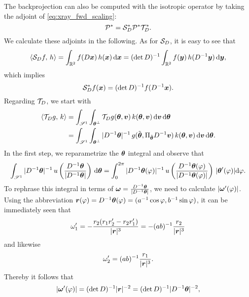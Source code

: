 \documentclass{amsart}
\newcommand*{\Dinv}{{\ensuremath{D^{-1}}}}
\renewcommand*{\phi}{\varphi}
\begin{document}
The backprojection can also be computed with the isotropic operator by taking the adjoint of \eqref{eq:xray_fwd_scaling}:
%
\begin{equation}
 \label{eq:xray_backproj_scaling}
 {\ensuremath{\mathcal{P}}}^* = {\mathcal{S}}_D^* {\mathcal{P}}^* {\mathcal{T}}_D^*.
\end{equation} 
%
We calculate these adjoints in the following. As for ${\mathcal{S}}_D$, it is easy to see that
%
\begin{equation*}
 \INNER{\OPS_D f}{h} = \int_{\RR^2} f(D\Bx)\, h(\Bx)\, \D\Bx = (\det D)^{-1} \int_{\RR^2} f(\By)\, h(\Dinv\By)\, \D\By, 
\end{equation*}
%
which implies
%
\begin{equation}
 \label{eq:vol_scaling_adjoint}
 \OPS_D^* f(\Bx) = (\det D)^{-1} f(\Dinv\Bx).
\end{equation}
%
Regarding ${\mathcal{T}}_D$, we start with
%
\begin{align}
 \INNER{\OPT_D g}{k} 
 &= \int_{\SPHERE^1} \int_{\Btheta^\perp} \OPT_D g(\Btheta, \Bv)\, k(\Btheta, \Bv)\, \D\Bv\, \D\Btheta \notag \\
 \label{eq:proj_scaling_adjoint_step1}
 &= \int_{\SPHERE^1} \int_{\Btheta^\perp} \ABS{\Dinv \Btheta}^{-1}\, g(\tilde\Btheta, \Pi_{\tilde\Btheta} \Dinv\Bv)\, 
 k(\Btheta, \Bv)\, \D\Bv\, \D\Btheta.
\end{align}
%
In the first step, we reparametrize the ${\boldsymbol{\theta}}$ integral and observe that
%
\begin{equation}
 \label{eq:spherint_reparam_step1}
 \int_{\SPHERE^1} \ABS{\Dinv \Btheta}^{-1}\, u\left(\frac{\Dinv\Btheta}{\ABS{\Dinv\Btheta}}\right)\, \D \Btheta = 
 \int_0^{2\pi} \ABS{\Dinv \Btheta(\phi)}^{-1}\, u\left(\frac{\Dinv\Btheta(\phi)}{\ABS{\Dinv\Btheta(\phi)}}\right)\, \ABS{\Btheta'(\phi)} 
 \D\phi. 
\end{equation}
%
To rephrase this integral in terms of $\Bomega = \frac{\Dinv\Btheta}{\ABS{\Dinv\Btheta}}$, we need to calculate $\ABS{\Bomega'(\phi)}$. 
Using the abbreviation $\Br(\phi) = \Dinv\Btheta(\phi) = (a^{-1}\cos\phi, b^{-1}\sin\phi)$, it can be immediately seen that
%
\begin{equation*}
 \omega_1' = - \frac{r_2 (r_1 r_2' - r_2 r_1')}{|{\boldsymbol{r}}|^3} = -(ab)^{-1} \frac{r_2}{|{\boldsymbol{r}}|^3}
\end{equation*}
%
and likewise
%
\begin{equation*}
 \omega_2' = (ab)^{-1} \frac{r_1}{|{\boldsymbol{r}}|^3}.
\end{equation*}
%
Thereby it follows that 
%
\begin{equation*}
 \ABS{\Bomega'(\phi)} = (\det D)^{-1} \ABS{\Br}^{-2} = (\det D)^{-1} \ABS{\Dinv \Btheta}^{-2},
\end{equation*}
\end{document}

